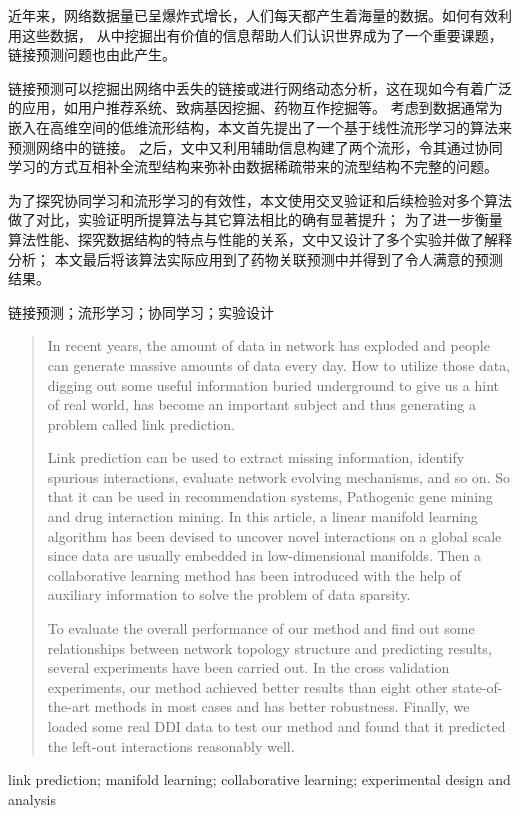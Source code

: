 

\begin{zhaiyao}

近年来，网络数据量已呈爆炸式增长，人们每天都产生着海量的数据。如何有效利用这些数据，
从中挖掘出有价值的信息帮助人们认识世界成为了一个重要课题，链接预测问题也由此产生。


链接预测可以挖掘出网络中丢失的链接或进行网络动态分析，这在现如今有着广泛的应用，如用户推荐系统、致病基因挖掘、药物互作挖掘等。
考虑到数据通常为嵌入在高维空间的低维流形结构，本文首先提出了一个基于线性流形学习的算法来预测网络中的链接。
之后，文中又利用辅助信息构建了两个流形，令其通过协同学习的方式互相补全流型结构来弥补由数据稀疏带来的流型结构不完整的问题。


为了探究协同学习和流形学习的有效性，本文使用交叉验证和后续检验对多个算法做了对比，实验证明所提算法与其它算法相比的确有显著提升；
为了进一步衡量算法性能、探究数据结构的特点与性能的关系，文中又设计了多个实验并做了解释分析；
本文最后将该算法实际应用到了药物关联预测中并得到了令人满意的预测结果。
\end{zhaiyao}


\vspace{150pt}

\begin{guanjianci}
链接预测；流形学习；协同学习；实验设计
\end{guanjianci}



\begin{abstract}


In recent years, the amount of data in network has exploded and people can generate massive amounts of data every day. 
How to utilize those data, digging out some useful information buried underground to give us a hint of real world, 
has become an important subject and thus generating a problem called link prediction.


Link prediction can be used to extract missing information, identify spurious interactions, evaluate network evolving mechanisms, and so on. 
So that it can be used in recommendation systems, Pathogenic gene mining and drug interaction mining. 
In this article, a linear manifold learning algorithm has been devised to uncover novel interactions on a global scale 
since data are usually embedded in low-dimensional manifolds. Then a collaborative learning method has been introduced 
with the help of auxiliary information to solve the problem of data sparsity.


To evaluate the overall performance of our method and find out some relationships between network topology structure 
and predicting results, several experiments have been carried out. In the cross validation experiments, 
our method achieved better results than eight other state-of-the-art methods in most cases and has better robustness. 
Finally, we loaded some real DDI data to test our method and found that it predicted the left-out interactions reasonably well.

\end{abstract}


\vspace{100pt}


\begin{keywords}
link prediction; manifold learning; collaborative learning; experimental design and analysis
\end{keywords} 